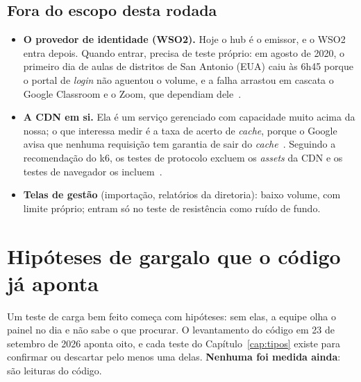 \documentclass[11pt, a4paper, oneside, openany]{report}
\begin{document}
\section{Fora do escopo desta rodada}

\begin{itemize}
  \item \textbf{O provedor de identidade (WSO2).} Hoje o hub é o emissor, e o
    WSO2 entra depois. Quando entrar, precisa de teste próprio: em agosto de
    2020, o primeiro dia de aulas de distritos de San Antonio (EUA) caiu às
    6h45 porque o portal de \emph{login} não aguentou o volume, e a falha
    arrastou em cascata o Google Classroom e o Zoom, que dependiam
    dele~\cite{carnett2020}.
  \item \textbf{A CDN em si.} Ela é um serviço gerenciado com capacidade muito
    acima da nossa; o que interessa medir é a taxa de acerto de
    \emph{cache}, porque o Google avisa que nenhuma requisição tem garantia de
    sair do \emph{cache}~\cite{gcdnoverview}. Seguindo a recomendação do k6, os
    testes de protocolo excluem os \emph{assets} da CDN e os testes de
    navegador os incluem~\cite{k6websites}.
  \item \textbf{Telas de gestão} (importação, relatórios da diretoria): baixo
    volume, com limite próprio; entram só no teste de resistência como ruído de
    fundo.
\end{itemize}

\chapter{Hipóteses de gargalo que o código já aponta}
\label{cap:hipoteses}

Um teste de carga bem feito começa com hipóteses: sem elas, a equipe olha o
painel no dia e não sabe o que procurar. O levantamento do código em 23 de
setembro de 2026 aponta oito, e cada teste do Capítulo~\ref{cap:tipos} existe
para confirmar ou descartar pelo menos uma delas. \textbf{Nenhuma foi medida
ainda}: são leituras do código.
\end{document}
